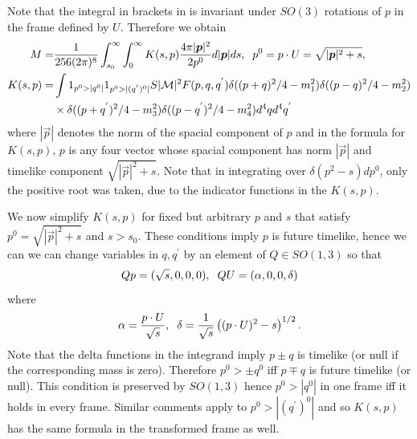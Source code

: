 Note that the integral in brackets in  is invariant under $SO(3)$ rotations of $p$ in the frame defined by $U$.  Therefore we obtain
\begin{align}\label{K_def}
M=&\frac{1}{256(2\pi)^8 }\int_{s_0}^\infty\int_0^\infty K(s,p)\frac{4\pi |\vec p|^2}{2p^0}d|\vec p|ds,\hspace{2mm} p^0=p\cdot U=\sqrt{|\vec p|^2+s},\\
K(s,p)=&\int 1_{p^0>|q^0|} 1_{p^0>|(q^{'})^0|}  S |\mathcal{M}|^2  F(p,q,q^{'}) \delta((p+q)^2/4-m_1^2)\delta((p-q)^2/4-m_2^2)\notag\\
&\times\delta((p+q^{'})^2/4-m_3^2)\delta((p-q^{'})^2/4-m_4^2)d^4qd^4q^{'}
\end{align}
where $|\vec p|$ denotes the norm of the spacial component of $p$ and in the formula for $K(s,p)$, $p$ is any four vector whose spacial component has norm $|\vec p|$ and timelike component $\sqrt{|\vec p|^2+s}$. Note that in integrating over $\delta(p^2-s)dp^0$, only the positive root was taken, due to the indicator functions in the $K(s,p)$.

We now simplify $K(s,p)$ for fixed but arbitrary $p$ and $s$ that satisfy $p^0=\sqrt{|\vec p|^2+s}$ and $s>s_0$.  These conditions imply $p$ is future timelike, hence we can we can change variables in  $q,q^{'}$ by an element of $Q\in SO(1,3)$ so that 
\begin{equation}
Qp=(\sqrt{s},0,0,0), \hspace{2mm} QU=(\alpha,0,0,\delta)
\end{equation}
where
\begin{equation}
\alpha=\frac{p\cdot U}{\sqrt{s}}, \hspace{2mm} \delta=\frac{1}{\sqrt{s}}\left((p\cdot U)^2-s \right)^{1/2}.
\end{equation}
Note that the delta functions in the integrand imply $p\pm q$ is  timelike (or null if the corresponding mass is zero).  Therefore $p^0>\pm q^0$ iff $p\mp q$ is future timelike (or null).  This condition is preserved by $SO(1,3)$ hence $p^0>|q^0|$ in one frame iff it holds in every frame.  Similar comments apply to $p^0>|(q^{'})^0|$ and so $K(s,p)$ has the same formula in the transformed frame as well.

